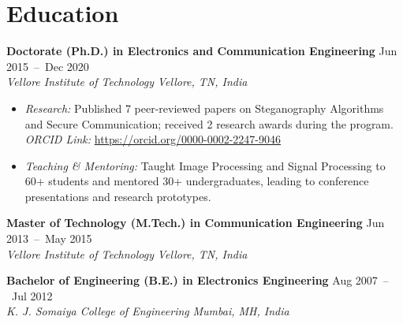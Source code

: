 \documentclass[a4paper,11pt]{article}
\begin{document}
\section{Education}
  \vspace{-1pt}
  \item
    \textbf{Doctorate (Ph.D.) in Electronics and Communication Engineering} \hfill {Jun 2015~--~Dec 2020} \\
    \textit{Vellore Institute of Technology} \hfill \textit{Vellore, TN, India}
  
  \vspace{-5pt}
    \begin{itemize}[leftmargin=*, itemsep = -2pt]
      \item \textit{Research: }Published 7 peer-reviewed papers on Steganography Algorithms and Secure Communication; received 2 research awards during the program. \textit{ORCID Link:} \href{https://orcid.org/0000-0002-2247-9046}{https://orcid.org/0000-0002-2247-9046}
      \item \textit{Teaching \& Mentoring: }Taught Image Processing and Signal Processing to 60+ students and mentored 30+ undergraduates, leading to conference presentations and research prototypes.
    \end{itemize}

  \item
    \textbf{Master of Technology (M.Tech.) in Communication Engineering} \hfill {Jun 2013~--~May 2015} \\
    \textit{Vellore Institute of Technology} \hfill \textit{Vellore, TN, India}
  \vspace{2pt}
  \item    
    \textbf{Bachelor of Engineering (B.E.) in Electronics Engineering} \hfill {Aug 2007~--~Jul 2012} \\
    \textit{K. J. Somaiya College of Engineering} \hfill \textit{Mumbai, MH, India}

  
\end{document}

